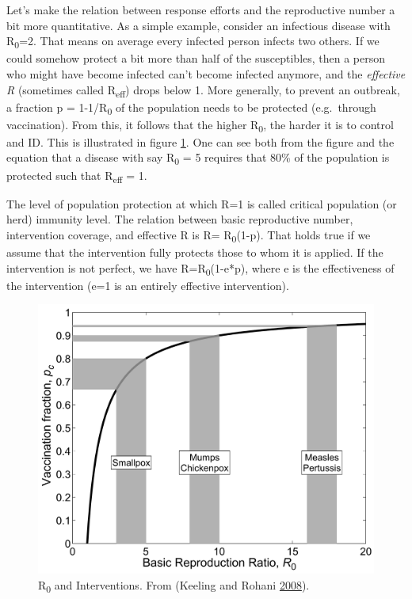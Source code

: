 \documentclass[]{book}
\theoremstyle{definition}
\theoremstyle{definition}
\theoremstyle{definition}
\theoremstyle{remark}
\begin{document}
Let's make the relation between response efforts and the reproductive
number a bit more quantitative. As a simple example, consider an
infectious disease with R\textsubscript{0}=2. That means on average
every infected person infects two others. If we could somehow protect a
bit more than half of the susceptibles, then a person who might have
become infected can't become infected anymore, and the \emph{effective
R} (sometimes called R\textsubscript{eff}) drops below 1. More
generally, to prevent an outbreak, a fraction p = 1-1/R\textsubscript{0}
of the population needs to be protected (e.g.~through vaccination). From
this, it follows that the higher R\textsubscript{0}, the harder it is to
control and ID. This is illustrated in figure
\ref{fig:krR0intervention}. One can see both from the figure and the
equation that a disease with say R\textsubscript{0} = 5 requires that
80\% of the population is protected such that R\textsubscript{eff} = 1.

The level of population protection at which R=1 is called critical
population (or herd) immunity level. The relation between basic
reproductive number, intervention coverage, and effective R is R=
R\textsubscript{0}(1-p). That holds true if we assume that the
intervention fully protects those to whom it is applied. If the
intervention is not perfect, we have R=R\textsubscript{0}(1-e*p), where
e is the effectiveness of the intervention (e=1 is an entirely effective
intervention).

\begin{figure}
\centering
\includegraphics{./images/kr-R0intervention.png}
\caption{\label{fig:krR0intervention}R\textsubscript{0} and Interventions.
From (Keeling and Rohani \protect\hyperlink{ref-keeling08}{2008}).}
\end{figure}
\end{document}

